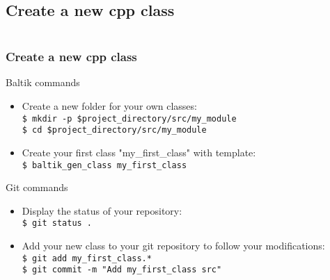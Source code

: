 \documentclass[10pt, hyperref={unicode=true,pdfusetitle, bookmarks=true,bookmarksnumbered=false,bookmarksopen=false, breaklinks=false,pdfborder={0 0 1},backref=true,colorlinks=true,linkcolor=darkblue,pageanchor, urlcolor=darkblue}]{beamer}
\begin{document}
\subsection{{\bf{Create a new cpp class}}}
\begin{frame}
\begin{columns}[c] 
\tableofcontents[sections={1-4},currentsection, currentsubsection]
\tableofcontents[sections={5-10},currentsection, currentsubsection]
\end{columns}
\end{frame}
\begin{frame}
\frametitle{Create a new cpp class}

\begin{block}{Baltik commands}
\begin{itemize}
\item Create a new folder for your own classes:\\
\texttt{\$ mkdir -p \$project\_directory/src/my\_module}\\
\texttt{\$ cd \$project\_directory/src/my\_module}\\
\item Create your first class "my\_first\_class" with template:\\
\texttt{\$ baltik\_gen\_class my\_first\_class}\\
\end{itemize}
\end{block}

\begin{alertblock}{Git commands}
\begin{itemize}
\item Display the status of your repository:\\
\texttt{\$ git status .}\\

\item Add your new class to your git repository to follow your modifications:\\
\texttt{\$ git add my\_first\_class.*}\\
\texttt{\$ git commit -m "Add my\_first\_class src"}\\
\end{itemize}
\end{alertblock}

\end{frame}
\end{document}
